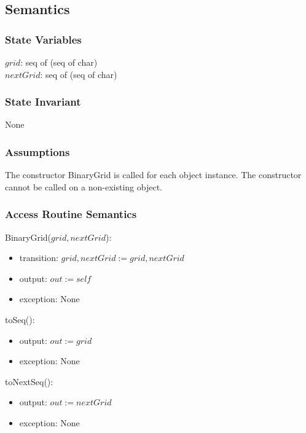 \documentclass[12pt]{article}
\begin{document}
\subsection* {Semantics}

\subsubsection* {State Variables}

$grid$:  seq of (seq of char)\\
$nextGrid$:  seq of (seq of char)


\subsubsection* {State Invariant}

None

\subsubsection* {Assumptions}

The constructor BinaryGrid is called for each object instance. The constructor cannot be called on
a non-existing object.

\subsubsection* {Access Routine Semantics}

BinaryGrid($grid, nextGrid$):
\begin{itemize}
\item transition: $grid, nextGrid := grid, nextGrid$
\item output: $out := \mathit{self}$
\item exception: None
\end{itemize}

\noindent toSeq():
\begin{itemize}
\item output: $out := grid$

\item exception: None
\end{itemize}

\noindent toNextSeq():
\begin{itemize}
\item output: $out := nextGrid$
\item exception: None
\end{itemize}

\newpage
\end{document}
